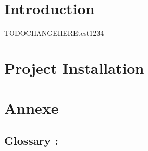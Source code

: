\documentclass[11pt,a4paper,sans]{report}
\begin{document}
\newpage
\tableofcontents
\vspace*{3cm}
\begingroup\let\clearpage\relax

	\newpage
	\chapter{Introduction}

	\begin{comment}
	\end{comment}

	TODOCHANGEHEREtest1234\cite{greenwade93}

	\newpage
	\chapter{Project Installation}
	\newpage


	\newpage
	
	

	\newpage
	\listoffigures



	\newpage
	\chapter{Annexe}
	\section{Glossary :}
\end{document}
